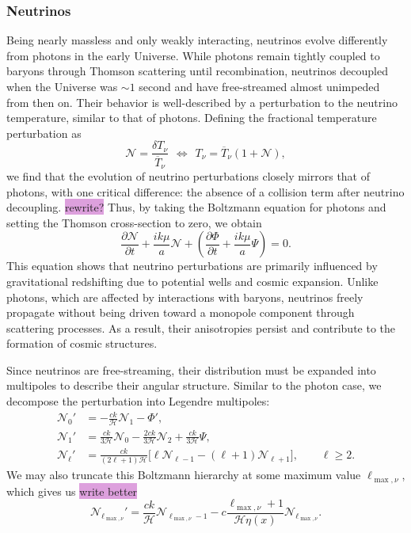 \documentclass{aa}
\numberwithin{equation}{section}
\numberwithin{table}{section}
\numberwithin{figure}{section}
\begin{document}
\subsubsection{Neutrinos}
Being nearly massless and only weakly interacting, neutrinos evolve differently from photons in the early Universe. While photons remain tightly coupled to baryons through Thomson scattering until recombination, neutrinos decoupled when the Universe was $\sim1$ second and have free-streamed almost unimpeded from then on. Their behavior is well-described by a perturbation to the neutrino temperature, similar to that of photons. Defining the fractional temperature perturbation as
\begin{equation}
  \mathcal{N} = \frac{\delta T_\nu}{\overline{T}_\nu} \hspace{5pt}\Leftrightarrow\hspace{5pt} T_\nu = \overline{T}_\nu (1 + \mathcal{N}),
\end{equation}
we find that the evolution of neutrino perturbations closely mirrors that of photons, with one critical difference: the absence of a collision term after neutrino decoupling. \colorbox{Plum}{rewrite?} Thus, by taking the Boltzmann equation for photons and setting the Thomson cross-section to zero, we obtain
\begin{equation}
\frac{\partial \mathcal{N}}{\partial t} + \frac{ik\mu}{a} \mathcal{N} + \left(\frac{\partial \Phi}{\partial t} + \frac{ik\mu}{a} \Psi \right) = 0.
\end{equation}
This equation shows that neutrino perturbations are primarily influenced by gravitational redshifting due to potential wells and cosmic expansion. Unlike photons, which are affected by interactions with baryons, neutrinos freely propagate without being driven toward a monopole component through scattering processes. As a result, their anisotropies persist and contribute to the formation of cosmic structures.

Since neutrinos are free-streaming, their distribution must be expanded into multipoles to describe their angular structure. Similar to the photon case, we decompose the perturbation into Legendre multipoles:
\begin{align}
\mathcal{N}_0' &= -\frac{ck}{\mathcal{H}} \mathcal{N}_1 - \Phi', \\
\mathcal{N}_1' &= \frac{ck}{3\mathcal{H}} \mathcal{N}_0 - \frac{2ck}{3\mathcal{H}} \mathcal{N}_2 + \frac{ck}{3\mathcal{H}} \Psi, \\
\mathcal{N}_\ell' &= \frac{ck}{(2\ell + 1)\mathcal{H}} \Big[\ell\mathcal{N}_{\ell-1} -(\ell+1)\mathcal{N}_{\ell+1}\Big], \qquad \ell \geq 2.
\end{align}
We may also truncate this Boltzmann hierarchy at some maximum value $\ell_{\max,\nu}$, which gives us \colorbox{Plum}{write better}
\begin{equation}
  \mathcal{N}_{\ell_{\max,\nu}}' = \frac{ck}{\mathcal{H}} \mathcal{N}_{\ell_{\max,\nu}-1} - c \frac{\ell_{\max,\nu} + 1}{\mathcal{H} \eta(x)} \mathcal{N}_{\ell_{\max,\nu}}.
\end{equation}
\end{document}
